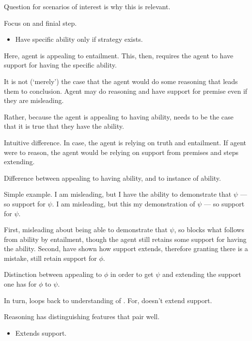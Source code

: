 \begin{note}
  Question for scenarios of interest is why this is relevant.

  Focus on \AR{} and finial step.
  \begin{itemize}
  \item Have specific ability only if strategy exists.
  \end{itemize}
  Here, agent is appealing to entailment.
  This, then, requires the agent to have support for having the specific ability.

  It is not (`merely') the case that the agent would do some reasoning that leads them to conclusion.
  Agent may do reasoning and have support for premise even if they are misleading.

  Rather, because the agent is appealing to having ability, needs to be the case that it is true that they have the ability.

  Intuitive difference.
  In \AR{} case, the agent is relying on truth and entailment.
  If agent were to reason, the agent would be relying on support from premises and steps extending.

  Difference between appealing to having ability, and to instance of ability.

  Simple example.
  I am misleading, but I have the ability to demonstrate that \(\psi\) --- so support for \(\psi\).
  I am misleading, but this my demonstration of \(\psi\) --- so support for \(\psi\).

  First, misleading about being able to demonstrate that \(\psi\), so blocks what follows from ability by entailment, though the agent still retains some support for having the ability.
  Second, have shown how support extends, therefore granting there is a mistake, still retain support for \(\phi\).

  Distinction between appealing to \(\phi\) in order to get \(\psi\) and extending the support one has for \(\phi\) to \(\psi\).

  In turn, loops back to understanding of \nI{}.
  For, \nI{} doesn't extend support.
\end{note}

\begin{note}
  Reasoning has distinguishing features that pair well.
  \begin{itemize}
  \item Extends support.
  \end{itemize}
\end{note}

